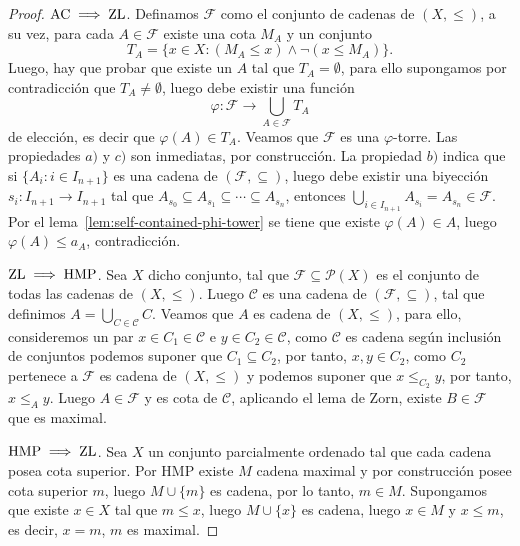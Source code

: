 \documentclass[11pt,oneside,a4paper]{book}
\renewcommand{\P}{\mathcal{P}}
\begin{document}
\begin{proof}
$\rm AC\implies ZL$. Definamos $\mathcal{F}$ como el conjunto de cadenas de $(X,\leq)$, a su vez, para cada $A\in\mathcal{F}$ existe una cota $M_A$ y un conjunto
$$T_A=\{x\in X:(M_A\leq x)\wedge\neg(x\leq M_A)\}.$$
Luego, hay que probar que existe un $A$ tal que $T_A=\emptyset$, para ello supongamos por contradicción que $T_A\neq\emptyset$, luego debe existir una función
$$\varphi:\mathcal{F}\rightarrow\bigcup_{A\in\mathcal{F}}T_A$$
de elección, es decir que $\varphi(A)\in T_A$. Veamos que $\mathcal{F}$ es una $\varphi$-torre. Las propiedades $a)$ y $c)$ son inmediatas, por construcción. La propiedad $b)$ indica que si $\{A_i:i\in I_{n+1}\}$ es una cadena de $(\mathcal{F},\subseteq)$, luego debe existir una biyección $s_i:I_{n+1}\rightarrow I_{n+1}$ tal que $A_{s_0}\subseteq A_{s_1}\subseteq\cdots\subseteq A_{s_n}$, entonces $\bigcup_{i\in I_{n+1}}A_{s_i}=A_{s_n}\in\mathcal{F}$. Por el lema~\ref{lem:self-contained-phi-tower} se tiene que existe $\varphi(A)\in A$, luego $\varphi(A)\leq a_A$, contradicción.

$\rm ZL\implies HMP$. Sea $X$ dicho conjunto, tal que $\mathcal{F}\subseteq\P(X)$ es el conjunto de todas las cadenas de $(X,\leq)$. Luego $\mathcal{C}$ es una cadena de $(\mathcal{F},\subseteq)$, tal que definimos $A=\bigcup_{C\in\mathcal{C}} C$. Veamos que $A$ es cadena de $(X,\leq)$, para ello, consideremos un par $x\in C_1\in\mathcal{C}$ e $y\in C_2\in\mathcal{C}$, como $\mathcal{C}$ es cadena según inclusión de conjuntos podemos suponer que $C_1\subseteq C_2$, por tanto, $x,y\in C_2$, como $C_2$ pertenece a $\mathcal{F}$ es cadena de $(X,\leq)$ y podemos suponer que $x\leq_{C_2}y$, por tanto, $x\leq_A y$. Luego $A\in\mathcal{F}$ y es cota de $\mathcal{C}$, aplicando el lema de Zorn, existe $B\in\mathcal{F}$ que es maximal.

$\rm HMP\implies ZL$. Sea $X$ un conjunto parcialmente ordenado tal que cada cadena posea cota superior. Por HMP existe $M$ cadena maximal y por construcción posee cota superior $m$, luego $M\cup\{m\}$ es cadena, por lo tanto, $m\in M$. Supongamos que existe $x\in X$ tal que $m\leq x$, luego $M\cup\{x\}$ es cadena, luego $x\in M$ y $x\leq m$, es decir, $x=m$, $m$ es maximal.


\end{proof}
\end{document}
